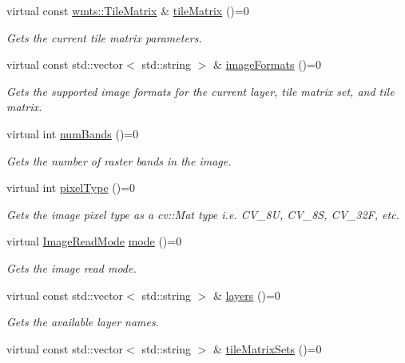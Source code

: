 \begin{DoxyCompactItemize}
virtual const \hyperlink{structdg_1_1deepcore_1_1imagery_1_1wmts_1_1_tile_matrix}{wmts\+::\+Tile\+Matrix} \& \hyperlink{group___imagery_module_ga0f308a2d98dc9f34b8ca651576265449}{tile\+Matrix} ()=0
\begin{DoxyCompactList}\small\item\em Gets the current tile matrix parameters. \end{DoxyCompactList}\item 
virtual const std\+::vector$<$ std\+::string $>$ \& \hyperlink{group___imagery_module_ga48b6f633e02c44d955b4d4b1b8352b57}{image\+Formats} ()=0
\begin{DoxyCompactList}\small\item\em Gets the supported image formats for the current layer, tile matrix set, and tile matrix. \end{DoxyCompactList}\item 
virtual int \hyperlink{group___imagery_module_ga7b7d8333be9d5386d8ddca5148b041b5}{num\+Bands} ()=0
\begin{DoxyCompactList}\small\item\em Gets the number of raster bands in the image. \end{DoxyCompactList}\item 
virtual int \hyperlink{group___imagery_module_gaa94fd511ae5e578357ceba16a9039b51}{pixel\+Type} ()=0
\begin{DoxyCompactList}\small\item\em Gets the image pixel type as a cv\+::\+Mat type i.\+e. C\+V\+\_\+8U, C\+V\+\_\+8S, C\+V\+\_\+32F, etc. \end{DoxyCompactList}\item 
virtual \hyperlink{group___imagery_module_ga1db94ae833853b71ed501bb1ea8c1c24}{Image\+Read\+Mode} \hyperlink{classdg_1_1deepcore_1_1imagery_1_1_map_service_client_ae727c872288e3a4219f80b6caa90ff3a}{mode} ()=0
\begin{DoxyCompactList}\small\item\em Gets the image read mode. \end{DoxyCompactList}\item 
virtual const std\+::vector$<$ std\+::string $>$ \& \hyperlink{group___imagery_module_ga51617c7aeaf00918210d64aaf5712d4e}{layers} ()=0
\begin{DoxyCompactList}\small\item\em Gets the available layer names. \end{DoxyCompactList}\item 
virtual const std\+::vector$<$ std\+::string $>$ \& \hyperlink{group___imagery_module_ga1cf271559e56836cf29176382c934a0c}{tile\+Matrix\+Sets} ()=0

\end{DoxyCompactItemize}
